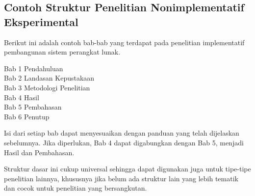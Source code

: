 \subsection{Contoh Struktur Penelitian Nonimplementatif Eksperimental}

Berikut ini adalah contoh bab-bab yang terdapat pada penelitian implementatif pembangunan sistem perangkat lunak. 
\begin{displayquote}
  Bab 1 Pendahuluan \\
  Bab 2 Landasan Kepustakaan \\
  Bab 3 Metodologi Penelitian \\
  Bab 4 Hasil \\
  Bab 5 Pembahasan \\
  Bab 6 Penutup
\end{displayquote}

Isi dari setiap bab dapat menyesuaikan dengan panduan yang telah dijelaskan sebelumnya. Jika diperlukan, Bab 4 dapat digabungkan dengan Bab 5, menjadi Hasil dan Pembahasan. 

Struktur dasar ini cukup universal sehingga dapat digunakan juga untuk tipe-tipe penelitian lainnya, khususnya jika belum ada struktur lain yang lebih tematik dan cocok untuk penelitian yang bersangkutan.
